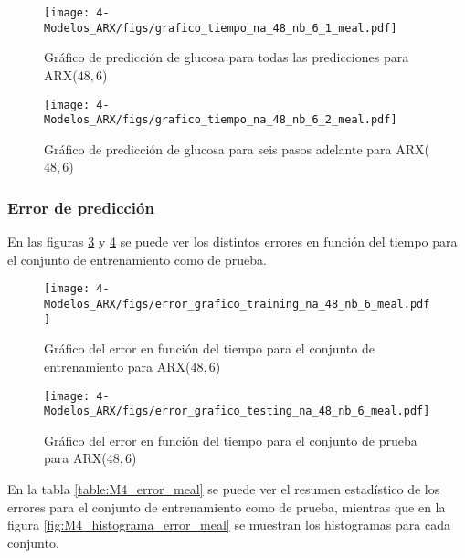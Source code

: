 \begin{figure}[H]
	\centering
	\texttt{[image: 4-Modelos\_ARX/figs/grafico\_tiempo\_na\_48\_nb\_6\_1\_meal.pdf]}
	\caption{Gráfico de predicción de glucosa para todas las predicciones para ARX($48, 6$)}
	\label{fig:M4_grafico_tiempo_1_meal}
\end{figure}

\begin{figure}[H]
	\centering
	\texttt{[image: 4-Modelos\_ARX/figs/grafico\_tiempo\_na\_48\_nb\_6\_2\_meal.pdf]}
	\caption{Gráfico de predicción de glucosa para seis pasos adelante para ARX($48, 6$)}
	\label{fig:M4_grafico_tiempo_2_meal}
\end{figure}


\subsubsection*{Error de predicción}

En las figuras \ref{fig:M4_error_train_meal} y \ref{fig:M4_error_test_meal} se puede ver los distintos errores en función del tiempo para el conjunto de entrenamiento como de prueba.

\begin{figure}[H]
	\centering
	\texttt{[image: 4-Modelos\_ARX/figs/error\_grafico\_training\_na\_48\_nb\_6\_meal.pdf]}
	\caption{Gráfico del error en función del tiempo para el conjunto de entrenamiento para ARX($48, 6$)}
	\label{fig:M4_error_train_meal}
\end{figure}

\begin{figure}[H]
	\centering
	\texttt{[image: 4-Modelos\_ARX/figs/error\_grafico\_testing\_na\_48\_nb\_6\_meal.pdf]}
	\caption{Gráfico del error en función del tiempo para el conjunto de prueba para ARX($48, 6$)}
	\label{fig:M4_error_test_meal}
\end{figure}


En la tabla \ref{table:M4_error_meal} se puede ver el resumen estadístico de los errores para el conjunto de entrenamiento como de prueba, mientras que en la figura \ref{fig:M4_histograma_error_meal} se muestran los histogramas para cada conjunto.

